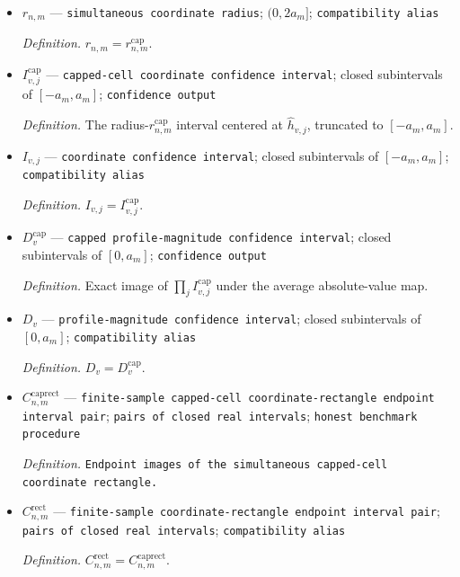 \documentclass{article}
\begin{document}
\begin{itemize}
  \par\smallskip\noindent\emph{Definition.} \(r^{\mathrm{cap}}_{n,m}=\min\{2a_m,\sqrt{32m\log(6m/\delta_0)/n}\}\).
  \item \(r_{n,m}\) --- \texttt{simultaneous coordinate radius}; \((0,2a_m]\); \texttt{compatibility alias}
  \par\smallskip\noindent\emph{Definition.} \(r_{n,m}=r^{\mathrm{cap}}_{n,m}\).
  \item \(I^{\mathrm{cap}}_{v,j}\) --- \texttt{capped-\allowbreak{}cell coordinate confidence interval}; closed subintervals of \([-a_m,a_m]\); \texttt{confidence output}
  \par\smallskip\noindent\emph{Definition.} The radius-\(r^{\mathrm{cap}}_{n,m}\) interval centered at \(\widehat h_{v,j}\), truncated to \([-a_m,a_m]\).
  \item \(I_{v,j}\) --- \texttt{coordinate confidence interval}; closed subintervals of \([-a_m,a_m]\); \texttt{compatibility alias}
  \par\smallskip\noindent\emph{Definition.} \(I_{v,j}=I^{\mathrm{cap}}_{v,j}\).
  \item \(D^{\mathrm{cap}}_v\) --- \texttt{capped profile-\allowbreak{}magnitude confidence interval}; closed subintervals of \([0,a_m]\); \texttt{confidence output}
  \par\smallskip\noindent\emph{Definition.} Exact image of \(\prod_j I^{\mathrm{cap}}_{v,j}\) under the average absolute-value map.
  \item \(D_v\) --- \texttt{profile-\allowbreak{}magnitude confidence interval}; closed subintervals of \([0,a_m]\); \texttt{compatibility alias}
  \par\smallskip\noindent\emph{Definition.} \(D_v=D^{\mathrm{cap}}_v\).
  \item \(C^{\mathrm{caprect}}_{n,m}\) --- \texttt{finite-\allowbreak{}sample capped-\allowbreak{}cell coordinate-\allowbreak{}rectangle endpoint interval pair}; \texttt{pairs of closed real intervals}; \texttt{honest benchmark procedure}
  \par\smallskip\noindent\emph{Definition.} \texttt{Endpoint images of the simultaneous capped-\allowbreak{}cell coordinate rectangle.}
  \item \(C^{\mathrm{rect}}_{n,m}\) --- \texttt{finite-\allowbreak{}sample coordinate-\allowbreak{}rectangle endpoint interval pair}; \texttt{pairs of closed real intervals}; \texttt{compatibility alias}
  \par\smallskip\noindent\emph{Definition.} \(C^{\mathrm{rect}}_{n,m}=C^{\mathrm{caprect}}_{n,m}\).
\end{itemize}
\end{document}
